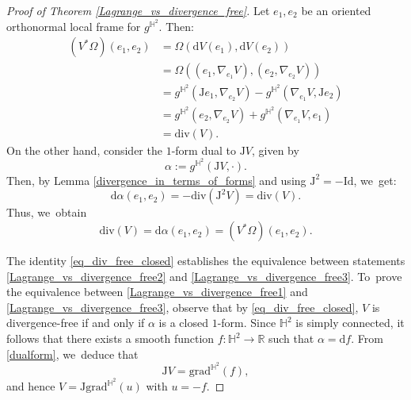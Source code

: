 \documentclass[11pt]{article}
\theoremstyle{plain}
\theoremstyle{definition}
\begin{document}
\begin{proof}[Proof of Theorem \ref{Lagrange_vs_divergence_free}]
Let \(e_1, e_2 \) be an oriented orthonormal local frame for \(g^{\mathbb{H}^2} \). Then:
\begin{align*}
(V^*\Omega)(e_1, e_2)
&= \Omega(\mathrm{d}V(e_1), \mathrm{d}V(e_2)) \\
&= \Omega((e_1, \nabla_{e_1}V), (e_2, \nabla_{e_2}V)) \\
&= g^{\mathbb{H}^2}(\mathrm{J}e_1, \nabla_{e_2}V) - g^{\mathbb{H}^{2}}(\nabla_{e_1}V, \mathrm{J}e_2) \\
&= g^{\mathbb{H}^2}(e_2, \nabla_{e_2}V) + g^{\mathbb{H}^{2}}(\nabla_{e_1}V, e_1) \\
&= \mathrm{div}(V).
\end{align*}
On the other hand, consider the $1$-form dual to \(\mathrm{J}V \), given by
\begin{equation}\label{dualform}
\alpha := g^{\mathbb{H}^2}(\mathrm{J}V, \cdot).
\end{equation}
Then, by Lemma \ref{divergence_in_terms_of_forms} and using \(\mathrm{J}^2 = -\mathrm{Id} \), we~get:
\[
\mathrm{d}\alpha(e_1, e_2) = -\mathrm{div}(\mathrm{J}^2 V) = \mathrm{div}(V).
\]
Thus, we~obtain
\begin{equation}\label{eq_div_free_closed}
\mathrm{div}(V) = \mathrm{d}\alpha(e_1, e_2) = (V^*\Omega)(e_1, e_2).
\end{equation}

The identity \eqref{eq_div_free_closed} establishes the equivalence between statements \eqref{Lagrange_vs_divergence_free2} and \eqref{Lagrange_vs_divergence_free3}. To~prove the equivalence between \eqref{Lagrange_vs_divergence_free1} and \eqref{Lagrange_vs_divergence_free3}, observe that by \eqref{eq_div_free_closed}, \(V \) is divergence-free if and only if \(\alpha \) is a closed $1$-form. Since \(\mathbb{H}^2 \) is simply connected, it follows that there exists a smooth function \(f: \mathbb{H}^2 \to \mathbb{R} \) such that \(\alpha = \mathrm{d}f \). From \eqref{dualform}, we~deduce that
\[
\mathrm{J}V = \mathrm{grad}^{\mathbb{H}^2}(f),
\]
and hence \(V = \mathrm{J} \mathrm{grad}^{\mathbb{H}^2} (u) \) with \(u = -f \).
\end{proof}
\end{document}

